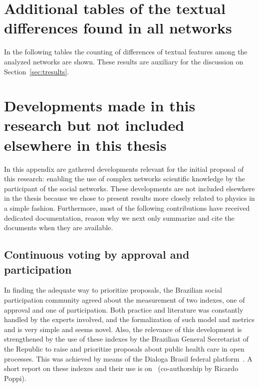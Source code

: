 
\begin{apendicesenv}
	\partapendices
	\chapter{Additional tables of the textual differences found in all networks}\label{ap:textd}
In the following tables the counting of differences of textual features among the analyzed networks
are shown.
	These results are auxiliary for the discussion on Section~\ref{sec:tresults}.
\FloatBarrier











\chapter{Developments made in this research but not included elsewhere in this thesis}\label{ap:vot}
In this appendix are gathered developments relevant for the initial proposal of this research:
enabling the use of complex networks scientific knowledge by the participant of the social networks.
These developments are not included elsewhere in the thesis because we chose to present results
more closely related to physics in a simple fashion.
Furthermore, most of the following contributions have received dedicated documentation,
reason why we next only summarize and cite the documents when they are available.

\section{Continuous voting by approval and participation}
In finding the adequate way to prioritize proposals, the Brazilian social participation community agreed about the measurement of two indexes,
one of approval and one of participation. Both practice and literature
was constantly handled by the experts involved, and the formalization
of such model and metrics and is very simple and seems novel.
Also, the relevance of this development is strengthened by the use of these indexes by the
Brazilian General Secretariat of the Republic to raise and prioritize
proposals about public health care in open processes.
This was achieved by means of the Dialoga Brasil federal platform~\cite{dialoga}.
A short report on these indexes and their use is on~\cite{dialogaAlg}
	(co-authorship by Ricardo Poppi).


\end{apendicesenv}
